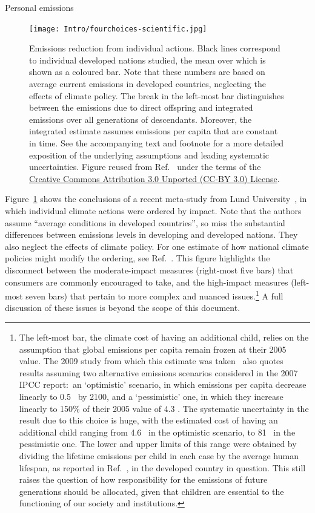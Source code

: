 \documentclass[../SustainableHEP.tex]{subfiles}
\begin{document}
\begin{inset}{Personal emissions}%
\begin{figure}
    \captionsetup{type=figure}
    \texttt{[image: Intro/fourchoices-scientific.jpg]}
    \caption[Emissions reduction from individual actions]{Emissions reduction from individual actions.  Black lines correspond to individual developed nations studied, the mean over which is shown as a coloured bar.  Note that these numbers are based on average current emissions in developed countries, neglecting the effects of climate policy.  The break in the left-most bar distinguishes between the emissions due to direct offspring and integrated emissions over all generations of descendants.  Moreover, the integrated estimate assumes emissions per capita that are constant in time. See the accompanying text and footnote for a more detailed exposition of the underlying assumptions and leading systematic uncertainties. Figure reused from Ref.~\cite{Wynes_2017} under the terms of the \href{https://creativecommons.org/licenses/by/3.0/}{Creative Commons Attribution 3.0 Unported (CC-BY 3.0) License}.}
    \label{fig:Intro-EffectiveEmissionsReduction}
\end{figure} 
Figure~\ref{fig:Intro-EffectiveEmissionsReduction} shows the conclusions of a recent meta-study from Lund University~\cite{Wynes_2017}, in which individual climate actions were ordered by impact.  Note that the authors assume ``average conditions in developed countries'', so miss the substantial differences between emissions levels in developing and developed nations.  They also neglect the effects of climate policy.  For one estimate of how national climate policies might modify the ordering, see Ref.~\cite{FoundersPledge}. This figure highlights the disconnect between the moderate-impact measures (right-most five bars) that consumers are commonly encouraged to take, and the high-impact measures (left-most seven bars) that pertain to more complex and nuanced issues.\footnote{The left-most bar, the climate cost of having an additional child, relies on the assumption that global emissions per capita remain frozen at their 2005 value.  The 2009 study from which this estimate was taken~\cite{MURTAUGH200914} also quotes results assuming two alternative
emissions scenarios considered in the 2007 IPCC report:~an `optimistic' scenario, in which emissions per capita decrease linearly to 0.5 \tCdOe\ by 2100, and a `pessimistic' one, in which they increase linearly to 150\% of their 2005 value of 4.3 \tCdOe.  The systematic uncertainty in the result due to this choice is huge, with the estimated cost of having an additional child ranging from 4.6 \tCdOe\ in the optimistic scenario, to 81 \tCdOe\ in the pessimistic one.  The lower and upper limits of this range were obtained by dividing the lifetime emissions per child in each case by the average human lifespan, as reported in Ref.~\cite{UN2019}, in the developed country in question.
This still raises the question of how responsibility for the emissions of future generations should be allocated, given that children are essential to the functioning of our society and institutions.}
A full discussion of these issues is beyond the scope of this document.
\end{inset}
\end{document}
